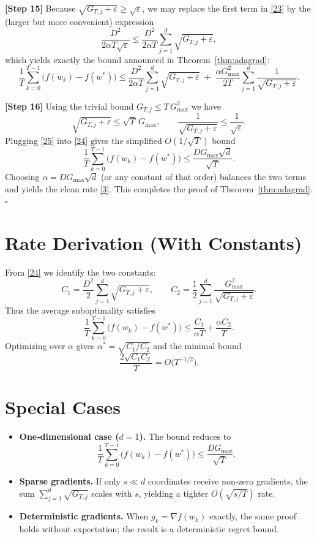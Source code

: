 \documentclass{article}
\begin{document}
\noindent\textbf{[Step 15]}  Because $\sqrt{G_{T,j}+\varepsilon}\ge\sqrt{\varepsilon}$, we may replace the first term in \eqref{23} by the (larger but more convenient) expression
\[
\frac{D^{2}}{2\alpha T\sqrt{\varepsilon}}
   \le
   \frac{D^{2}}{2\alpha T}\sum_{j=1}^{d}\sqrt{G_{T,j}+\varepsilon},
\]
which yields exactly the bound announced in Theorem~\ref{thm:adagrad}:
\[
\frac{1}{T}\sum_{k=0}^{T-1}\!\bigl(f(w_{k})-f(w^{*})\bigr)
   \le
   \frac{D^{2}}{2\alpha T}\sum_{j=1}^{d}\sqrt{G_{T,j}+\varepsilon}
   \;+\;
   \frac{\alpha G_{\max}^{2}}{2T}\sum_{j=1}^{d}\frac{1}{\sqrt{G_{T,j}+\varepsilon}} .
\tag{24}
\]

\noindent\textbf{[Step 16]}  Using the trivial bound $G_{T,j}\le T\,G_{\max}^{2}$ we have
\[
\sqrt{G_{T,j}+\varepsilon}\le\sqrt{T}\,G_{\max},
\qquad
\frac{1}{\sqrt{G_{T,j}+\varepsilon}}\le\frac{1}{\sqrt{\varepsilon}} .
\tag{25}
\]
Plugging \eqref{25} into \eqref{24} gives the simplified $O(1/\sqrt{T})$ bound
\[
\frac{1}{T}\sum_{k=0}^{T-1}\!\bigl(f(w_{k})-f(w^{*})\bigr)
   \le
   \frac{D G_{\max}\sqrt{d}}{\sqrt{T}} .
\tag{26}
\]
Choosing $\alpha = D G_{\max}\sqrt{d}$ (or any constant of that order) balances the two terms and yields the clean rate \eqref{3}.  This completes the proof of Theorem~\ref{thm:adagrad}. \hfill $\square$

\section*{Rate Derivation (With Constants)}
From \eqref{24} we identify the two constants:
\[
C_{1}= \frac{D^{2}}{2}\sum_{j=1}^{d}\sqrt{G_{T,j}+\varepsilon},
\qquad
C_{2}= \frac{1}{2}\sum_{j=1}^{d}\frac{G_{\max}^{2}}{\sqrt{G_{T,j}+\varepsilon}} .
\]
Thus the average suboptimality satisfies
\[
\frac{1}{T}\sum_{k=0}^{T-1}\bigl(f(w_{k})-f(w^{*})\bigr)
   \le \frac{C_{1}}{\alpha T}+\frac{\alpha C_{2}}{T}.
\]
Optimizing over $\alpha$ gives $\alpha^{*}= \sqrt{C_{1}/C_{2}}$ and the minimal bound
\[
\frac{2\sqrt{C_{1}C_{2}}}{T}
   = O\!\bigl(T^{-1/2}\bigr).
\]

\section*{Special Cases}
\begin{itemize}
\item \textbf{One‑dimensional case ($d=1$).} The bound reduces to
\[
\frac{1}{T}\sum_{k=0}^{T-1}\bigl(f(w_{k})-f(w^{*})\bigr)
   \le \frac{D G_{\max}}{\sqrt{T}} .
\]
\item \textbf{Sparse gradients.} If only $s\ll d$ coordinates receive non‑zero gradients, the sum $\sum_{j=1}^{d}\sqrt{G_{T,j}}$ scales with $s$, yielding a tighter $O(\sqrt{s/T})$ rate.
\item \textbf{Deterministic gradients.} When $g_{k}=\nabla f(w_{k})$ exactly, the same proof holds without expectation; the result is a deterministic regret bound.
\end{itemize}
\end{document}
